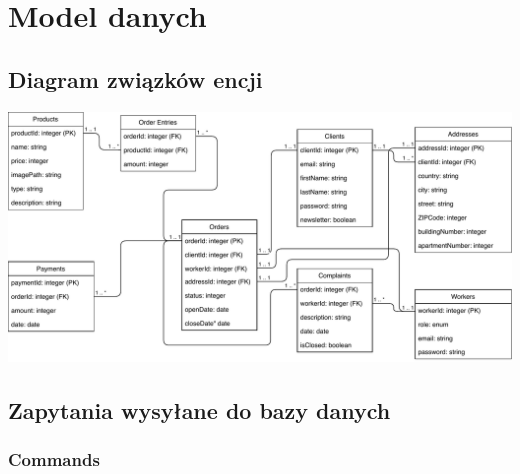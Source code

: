 \documentclass[12pt]{report}
\begin{document}
	
	

	\renewcommand{\thesection}{\thechapter.\arabic{section}}		
	
\chapter{Model danych}
	
	\section{Diagram związków encji}
		\includegraphics[width=500pt]{database.pdf}
		\newpage
		
	\section{Zapytania wysyłane do bazy danych}
	
		\subsection{Commands}
		
\end{document}
